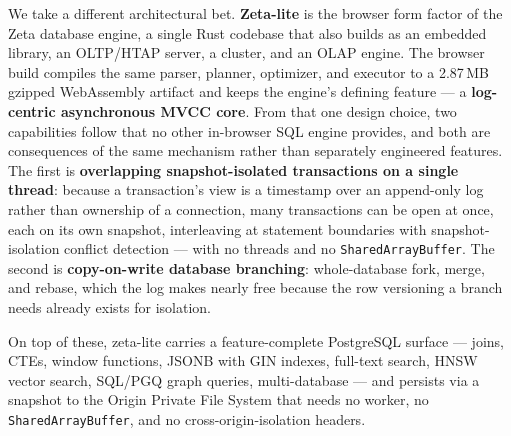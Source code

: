 \documentclass[11pt]{article}
\begin{document}
We take a different architectural bet. \textbf{Zeta-lite} is the browser form
factor of the Zeta database engine, a single Rust codebase that also builds as an
embedded library, an OLTP/HTAP server, a cluster, and an OLAP engine. The browser
build compiles the same parser, planner, optimizer, and executor to a 2.87\,MB
gzipped WebAssembly artifact and keeps the engine's defining feature --- a
\textbf{log-centric asynchronous MVCC core}. From that one design choice, two
capabilities follow that no other in-browser SQL engine provides, and both are
consequences of the same mechanism rather than separately engineered features. The
first is \textbf{overlapping snapshot-isolated transactions on a single thread}:
because a transaction's view is a timestamp over an append-only log rather than
ownership of a connection, many transactions can be open at once, each on its own
snapshot, interleaving at statement boundaries with snapshot-isolation conflict
detection --- with no threads and no \texttt{SharedArrayBuffer}. The second is
\textbf{copy-on-write database branching}: whole-database fork, merge, and rebase,
which the log makes nearly free because the row versioning a branch needs already
exists for isolation.

On top of these, zeta-lite carries a feature-complete PostgreSQL surface --- joins,
CTEs, window functions, JSONB with GIN indexes, full-text search, HNSW vector
search, SQL/PGQ graph queries, multi-database --- and persists via a snapshot to
the Origin Private File System that needs no worker, no \texttt{SharedArrayBuffer},
and no cross-origin-isolation headers.
\end{document}
